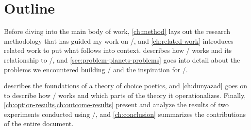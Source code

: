 \section{Outline}


Before diving into the main body of work, \cref{ch:method} lays out the research methodology that has guided my work on \dunyazad/, and \cref{ch:related-work} introduces related work to put what follows into context.
%
 describes how \skald/ works and its relationship to \minstrel/, and \cref{sec:problem-planets-problems} goes into detail about the problems we encountered building \problemplanets/ and the inspiration for \dunyazad/.


 describes the foundations of a theory of choice poetics, and \cref{ch:dunyazad} goes on to describe how \dunyazad/ works and which parts of the theory it operationalizes.
%
Finally, \cref{ch:option-results,ch:outcome-results} present and analyze the results of two experiments conducted using \dunyazad/, and \cref{ch:conclusion} summarizes the contributions of the entire document.
